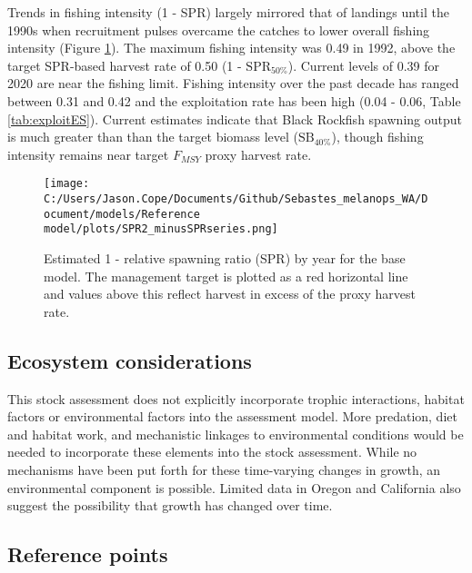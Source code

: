 \documentclass[11pt,
  english,
  letterpaper,
]{article}
\begin{document}
Trends in fishing intensity (1 - SPR) largely mirrored that of landings until the 1990s when recruitment pulses overcame the catches to lower overall fishing intensity (Figure \ref{fig:es-1-spr}). The maximum fishing intensity was 0.49 in 1992, above the target SPR-based harvest rate of 0.50 (1 - \(\text{SPR}_{50\%}\)). Current levels of 0.39 for 2020 are near the fishing limit. Fishing intensity over the past decade has ranged between 0.31 and 0.42 and the exploitation rate has been high (0.04 - 0.06, Table \ref{tab:exploitES}). Current estimates indicate that Black Rockfish spawning output is much greater than than the target biomass level (\(\text{SB}_{40\%}\)), though fishing intensity remains near target \(F_{MSY}\) proxy harvest rate.



\begin{figure}
\centering
\texttt{[image: C:/Users/Jason.Cope/Documents/Github/Sebastes\_melanops\_WA/Document/models/Reference model/plots/SPR2\_minusSPRseries.png]}
\caption{Estimated 1 - relative spawning ratio (SPR) by year for the base model. The management target is plotted as a red horizontal line and values above this reflect harvest in excess of the proxy harvest rate.\label{fig:es-1-spr}}
\end{figure}

\clearpage

\hypertarget{ecosystem-considerations}{%
\subsection*{Ecosystem considerations}\label{ecosystem-considerations}}

This stock assessment does not explicitly incorporate trophic interactions, habitat factors or environmental factors into the assessment model. More predation, diet and habitat work, and mechanistic linkages to environmental conditions would be needed to incorporate these elements into the stock assessment. While no mechanisms have been put forth for these time-varying changes in growth, an environmental component is possible. Limited data in Oregon and California also suggest the possibility that growth has changed over time.

\hypertarget{reference-points}{%
\subsection*{Reference points}\label{reference-points}}
\end{document}
